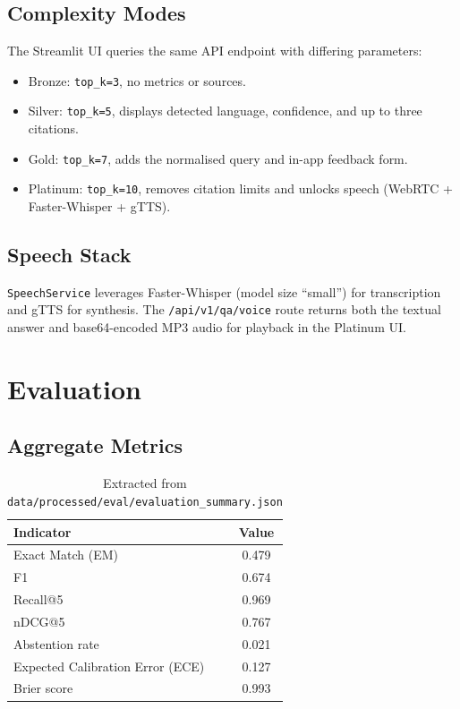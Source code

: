 \documentclass[12pt]{article}
\begin{document}
\subsection{Complexity Modes}
The Streamlit UI queries the same API endpoint with differing parameters:
\begin{itemize}
    \item Bronze: \texttt{top\_k=3}, no metrics or sources.
    \item Silver: \texttt{top\_k=5}, displays detected language, confidence, and up to three citations.
    \item Gold: \texttt{top\_k=7}, adds the normalised query and in-app feedback form.
    \item Platinum: \texttt{top\_k=10}, removes citation limits and unlocks speech (WebRTC + Faster-Whisper + gTTS).
\end{itemize}

\subsection{Speech Stack}
\texttt{SpeechService} leverages Faster-Whisper (model size ``small'') for transcription and gTTS for synthesis. The \texttt{/api/v1/qa/voice} route returns both the textual answer and base64-encoded MP3 audio for playback in the Platinum UI.

\section{Evaluation}
\subsection{Aggregate Metrics}
\begin{table}[h]
    \centering
    \begin{tabular}{lc}
        \toprule
        Indicator & Value \\
        \midrule
        Exact Match (EM) & 0.479 \\
        F1 & 0.674 \\
        Recall@5 & 0.969 \\
        nDCG@5 & 0.767 \\
        Abstention rate & 0.021 \\
        Expected Calibration Error (ECE) & 0.127 \\
        Brier score & 0.993 \\
        \bottomrule
    \end{tabular}
    \caption{Extracted from \texttt{data/processed/eval/evaluation\_summary.json}}
\end{table}
\end{document}
